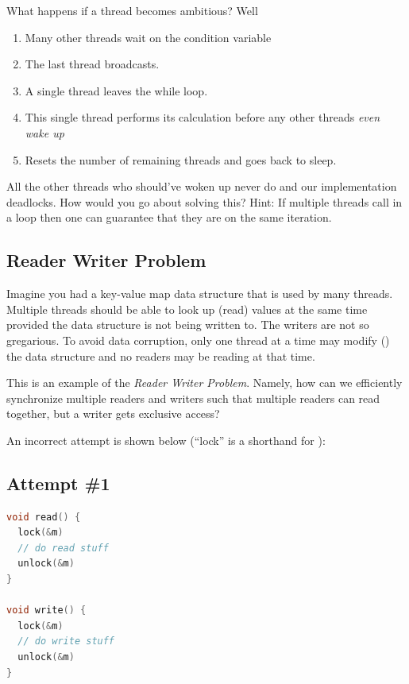 What happens if a thread becomes ambitious? Well

\begin{enumerate}
\item Many other threads wait on the condition variable
\item The last thread broadcasts.
\item A single thread leaves the while loop.
\item This single thread performs its calculation before any other threads \textit{even wake up}
\item Resets the number of remaining threads and goes back to sleep.
\end{enumerate}

All the other threads who should've woken up never do and our implementation deadlocks.
How would you go about solving this?
Hint: If multiple threads call  in a loop then one can guarantee that they are on the same iteration.

\subsection{Reader Writer Problem}

Imagine you had a key-value map data structure that is used by many threads.
Multiple threads should be able to look up (read) values at the same time provided the data structure is not being written to.
The writers are not so gregarious.
To avoid data corruption, only one thread at a time may modify () the data structure and no readers may be reading at that time.

This is an example of the \emph{Reader Writer Problem}.
Namely, how can we efficiently synchronize multiple readers and writers such that multiple readers can read together, but a writer gets exclusive access?

An incorrect attempt is shown below (``lock'' is a shorthand for ):

\subsection{Attempt \#1}

\begin{lstlisting}[language=C]
void read() {
  lock(&m)
  // do read stuff
  unlock(&m)
}

void write() {
  lock(&m)
  // do write stuff
  unlock(&m)
}
\end{lstlisting}

